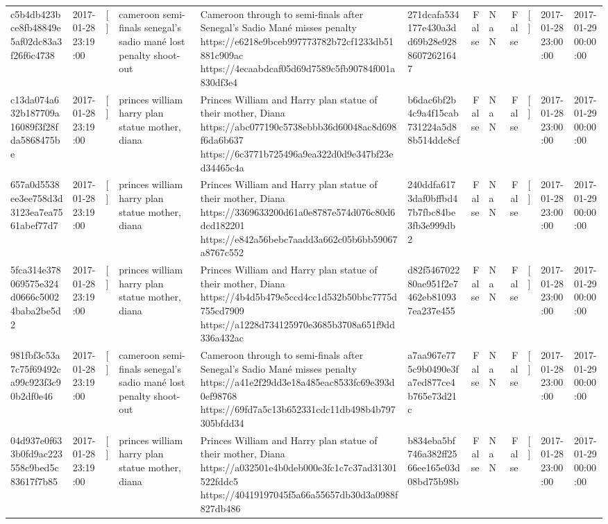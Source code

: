 \begin{tabular}{llllllrlrlll}
c5b4db423bce8fb48849e5af02dc83a3f26f6c4738 & 2017-01-28 23:19:00 & [] & cameroon semi-finals senegal's sadio mané lost penalty shoot-out & Cameroon through to semi-finals after Senegal’s Sadio Mané misses penalty https://e6218e9bceb997773782b72cf1233db51881c909ac https://4ecaabdcaf05d69d7589c5fb90784f001a830df3e4 & 271dcafa534177e430a3dd69b28e92886072621647 & False & NaN & False & [] & 2017-01-28 23:00:00 & 2017-01-29 00:00:00 \\
c13da074a632b187709a16089f3f28fda5868475be & 2017-01-28 23:19:00 & [] & princes william harry plan statue mother, diana & Princes William and Harry plan statue of their mother, Diana https://abc077190c5738ebbb36d60048ac8d698f6da6b637 https://6c3771b725496a9ea322d0d9e347bf23ed34465c4a & b6dac6bf2b4c9a4f15cab731224a5d88b514ddc8cf & False & NaN & False & [] & 2017-01-28 23:00:00 & 2017-01-29 00:00:00 \\
657a0d5538ee3ee758d3d3123ea7ea7561abef77d7 & 2017-01-28 23:19:00 & [] & princes william harry plan statue mother, diana & Princes William and Harry plan statue of their mother, Diana https://3369633200d61a0e8787e574d076c80d6dcd182201 https://e842a56bebc7aadd3a662c05b6bb59067a8767c552 & 240ddfa6173daf0bffbd47b7fbc84be3fb3e999db2 & False & NaN & False & [] & 2017-01-28 23:00:00 & 2017-01-29 00:00:00 \\
5fca314e378069575e324d0666c50024baba2be5d2 & 2017-01-28 23:19:00 & [] & princes william harry plan statue mother, diana & Princes William and Harry plan statue of their mother, Diana https://4b4d5b479e5ccd4cc1d532b50bbc7775d755cd7909 https://a1228d734125970e3685b3708a651f9dd336a432ac & d82f546702280ae951f2e7462eb810937ea237e455 & False & NaN & False & [] & 2017-01-28 23:00:00 & 2017-01-29 00:00:00 \\
981fbf3c53a7c75f69492ca99c923f3c90b2df0e46 & 2017-01-28 23:19:00 & [] & cameroon semi-finals senegal's sadio mané lost penalty shoot-out & Cameroon through to semi-finals after Senegal’s Sadio Mané misses penalty https://a41e2f29dd3e18a485eac8533fc69e393d0ef98768 https://69fd7a5c13b652331cdc11db498b4b797305bfdd34 & a7aa967e775c9b0490e3fa7ed877ce4b765e73d21c & False & NaN & False & [] & 2017-01-28 23:00:00 & 2017-01-29 00:00:00 \\
04d937e0f633b0fd9ac223558c9bed5c83617f7b85 & 2017-01-28 23:19:00 & [] & princes william harry plan statue mother, diana & Princes William and Harry plan statue of their mother, Diana https://a032501e4b0deb000e3fc1c7c37ad31301522fddc5 https://40419197045f5a66a55657db30d3a0988f827db486 & b834eba5bf746a382ff2566ee165e03d08bd75b98b & False & NaN & False & [] & 2017-01-28 23:00:00 & 2017-01-29 00:00:00 \\

\end{tabular}
